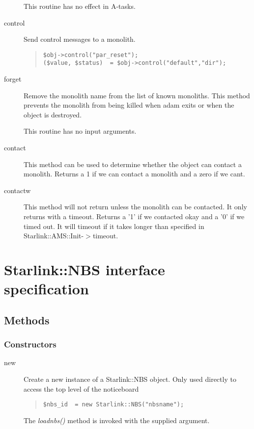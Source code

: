 \documentclass[twoside,11pt]{article}
\newenvironment{myquote}{\begin{quote}\begin{small}}{\end{small}\end{quote}}
\renewcommand{\_}{\texttt{\symbol{95}}}
\begin{document}
\begin{description}
This routine has no effect in A-tasks.

\item[control] \mbox{}

Send control messages to a monolith.
\begin{myquote}
\begin{verbatim}
$obj->control("par_reset");
($value, $status)  = $obj->control("default","dir");
\end{verbatim}
\end{myquote} %

\item[forget] \mbox{}

Remove the monolith name from the list of known monoliths.
This method prevents the monolith from being killed when adam
exits or when the object is destroyed.

This routine has no input arguments.

\item[contact] \mbox{}

This method can be used to determine whether the object can
contact a monolith. Returns a 1 if we can contact a monolith and
a zero if we cant.

\item[contactw] \mbox{}

This method will not return unless the monolith can be contacted.
It only returns with a timeout. Returns a '1' if we contacted okay
and a '0' if we timed out. It will timeout if it takes longer than
specified in Starlink::AMS::Init-$>$timeout.

\end{description}

\section{Starlink::NBS interface specification}

\subsection{Methods}

\subsubsection*{Constructors}%

\begin{description}

\item[new] \mbox{}

Create a new instance of a Starlink::NBS object.
Only used directly to access the top level of the noticeboard
\begin{myquote}
\begin{verbatim}
$nbs_id  = new Starlink::NBS("nbsname");
\end{verbatim}
\end{myquote} %

The {\em loadnbs()\/} method is invoked with the supplied argument.

\end{description}
\end{document}
